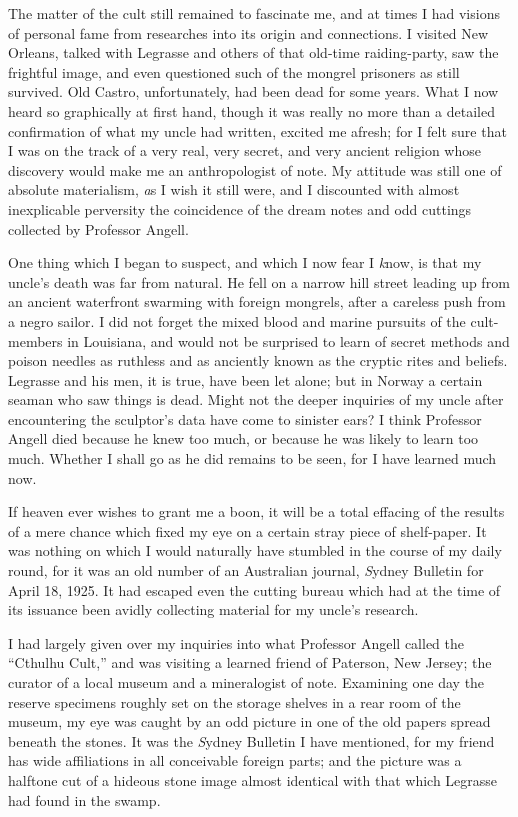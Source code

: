 The matter of the cult still remained to fascinate me, and at times I had visions of personal fame from researches into its origin and connections. I visited New Orleans, talked with Legrasse and others of that old-time raiding-party, saw the frightful image, and even questioned such of the mongrel prisoners as still survived. Old Castro, unfortunately, had been dead for some years. What I now heard so graphically at first hand, though it was really no more than a detailed confirmation of what my uncle had written, excited me afresh; for I felt sure that I was on the track of a very real, very secret, and very ancient religion whose discovery would make me an anthropologist of note. My attitude was still one of absolute materialism, {\emph as I wish it still were}, and I discounted with almost inexplicable perversity the coincidence of the dream notes and odd cuttings collected by Professor Angell.

One thing which I began to suspect, and which I now fear I {\emph know}, is that my uncle’s death was far from natural. He fell on a narrow hill street leading up from an ancient waterfront swarming with foreign mongrels, after a careless push from a negro sailor. I did not forget the mixed blood and marine pursuits of the cult-members in Louisiana, and would not be surprised to learn of secret methods and poison needles as ruthless and as anciently known as the cryptic rites and beliefs. Legrasse and his men, it is true, have been let alone; but in Norway a certain seaman who saw things is dead. Might not the deeper inquiries of my uncle after encountering the sculptor’s data have come to sinister ears? I think Professor Angell died because he knew too much, or because he was likely to learn too much. Whether I shall go as he did remains to be seen, for I have learned much now.
\endchapter


If heaven ever wishes to grant me a boon, it will be a total effacing of the results of a mere chance which fixed my eye on a certain stray piece of shelf-paper. It was nothing on which I would naturally have stumbled in the course of my daily round, for it was an old number of an Australian journal, {\emph Sydney Bulletin} for April 18, 1925. It had escaped even the cutting bureau which had at the time of its issuance been avidly collecting material for my uncle’s research.

I had largely given over my inquiries into what Professor Angell called the “Cthulhu Cult,” and was visiting a learned friend of Paterson, New Jersey; the curator of a local museum and a mineralogist of note. Examining one day the reserve specimens roughly set on the storage shelves in a rear room of the museum, my eye was caught by an odd picture in one of the old papers spread beneath the stones. It was the {\emph Sydney Bulletin} I have mentioned, for my friend has wide affiliations in all conceivable foreign parts; and the picture was a halftone cut of a hideous stone image almost identical with that which Legrasse had found in the swamp.

